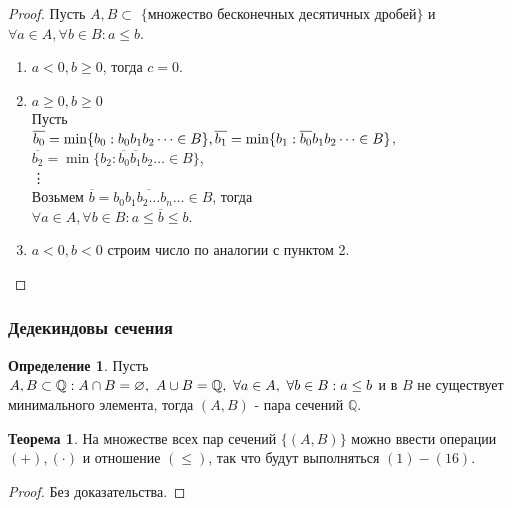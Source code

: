 \documentclass[a4paper, 12pt]{article}
\newcommand{\Q}{\mathbb{Q}}
\renewcommand{\emptyset}{\varnothing}
\theoremstyle{definition}
\newtheorem*{definition}{Определение}
\newtheorem*{theorem}{Теорема}
\begin{document}
        \begin{proof}
            Пусть $A,B\subset$ $\{$множество бесконечных десятичных дробей$\}$ и $\forall a\in A, \forall b\in B: a\leq b$.
            \begin{enumerate}
                \item $a<0, b\geq 0$, тогда $c=0$.
                \item $a\geq 0, b\geq 0$\\
                Пусть\\
                $\overline{b_0}=\min \{b_0: b_0b_1b_2\dots \in B\},\\
                \overline{b_1}=\min \{b_1: \overline{b_0}b_1b_2\dots \in B\}$,\\
                $\overline{b_2}=\min \{b_2: \overline{b_0}\overline{b_1}b_2 \dots \in B\}$,\\
                \vdots \\
                Возьмем $\overline{b}= \overline{b_0b_1b_2\dots b_n \dots}\in B$, тогда\\
                $\forall a\in A, \forall b\in B: a\leq \overline{b}\leq b$.\\
                \item $a<0, b<0$ строим число по аналогии с пунктом 2.
            \end{enumerate}
        \end{proof} 
    \subsubsection*{Дедекиндовы сечения}
        \begin{definition}
            Пусть $A,B\subset \Q: A\cap B = \emptyset,\ A\cup B=\Q,\ \forall a\in A,\ \forall b\in B:\\
            a\leq b$ и в $B$ не существует минимального элемента, тогда $(A,B)$ - пара сечений $\Q$.
        \end{definition} 
        \begin{theorem}
            На множестве всех пар сечений $\{(A,B)\}$ можно ввести операции $(+), (\cdot)$ и отношение $(\leq)$, так что будут выполняться $(1)-(16)$.
        \end{theorem} 
        \begin{proof}
            Без доказательства.
        \end{proof}
\end{document}
